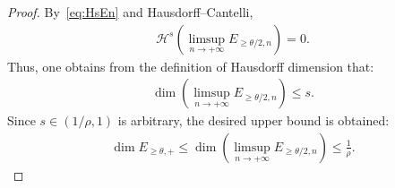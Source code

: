 \documentclass[10pt,a4paper]{amsart}
\begin{document}
\begin{proof}
By~\eqref{eq:HsEn} and Hausdorff--Cantelli, 
\begin{align*}
    \mathcal{H}^s\left(\limsup_{n\to+\infty}E_{\geq\theta/2,n}\right)=0.
\end{align*}
Thus, one obtains from the definition of Hausdorff dimension that:
\begin{align*}
    \dim\left(\limsup_{n\to+\infty}E_{\geq\theta/2,n}\right)\leq s.
\end{align*}
Since $s\in(1/\rho,1)$ is arbitrary, the desired upper bound is obtained:
\begin{align*}
    \dim{E_{\geq\theta,+}}\leq \dim\left(\limsup_{n\to+\infty}E_{\geq\theta/2,n}\right)\leq \frac{1}{\rho}.
\end{align*}
\end{proof}
\end{document}
